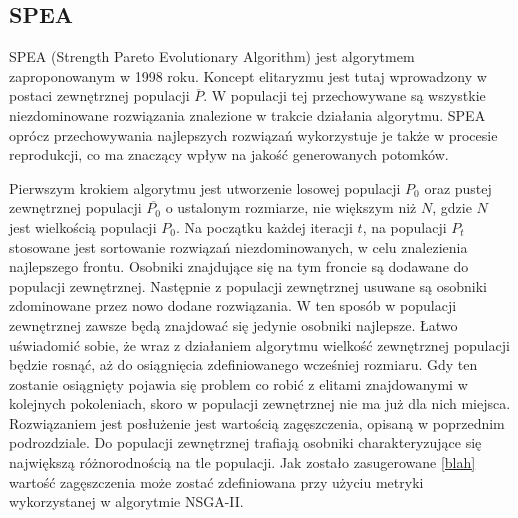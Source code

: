 \documentclass[twoside]{iisthesis}
\begin{document}
\subsection{SPEA}
SPEA (Strength Pareto Evolutionary Algorithm) jest algorytmem zaproponowanym w 1998 roku. Koncept elitaryzmu jest tutaj wprowadzony w postaci zewnętrznej populacji $\overline{P}$. W populacji tej przechowywane są wszystkie niezdominowane rozwiązania znalezione w trakcie działania algorytmu. SPEA oprócz przechowywania najlepszych rozwiązań wykorzystuje je także w procesie reprodukcji, co ma znaczący wpływ na jakość generowanych potomków.

Pierwszym krokiem algorytmu jest utworzenie losowej populacji $P_{0}$ oraz pustej zewnętrznej populacji $\overline{P_{0}}$ o ustalonym rozmiarze, nie większym niż $N$, gdzie $N$ jest wielkością populacji $P_{0}$. Na początku każdej iteracji $t$, na populacji $P_{t}$ stosowane jest sortowanie rozwiązań niezdominowanych, w celu znalezienia najlepszego frontu. Osobniki znajdujące się na tym froncie są dodawane do populacji zewnętrznej. Następnie z populacji zewnętrznej usuwane są osobniki zdominowane przez nowo dodane rozwiązania. W ten sposób w populacji zewnętrznej zawsze będą znajdować się jedynie osobniki najlepsze. Łatwo uświadomić sobie, że wraz z działaniem algorytmu wielkość zewnętrznej populacji będzie rosnąć, aż do osiągnięcia zdefiniowanego wcześniej rozmiaru. Gdy ten zostanie osiągnięty pojawia się problem co robić z elitami znajdowanymi w kolejnych pokoleniach, skoro w populacji zewnętrznej nie ma już dla nich miejsca. Rozwiązaniem jest posłużenie jest wartością zagęszczenia, opisaną w poprzednim podrozdziale. Do populacji zewnętrznej trafiają osobniki charakteryzujące się największą różnorodnością na tle populacji. Jak zostało zasugerowane \ref{blah} wartość zagęszczenia może zostać zdefiniowana przy użyciu metryki wykorzystanej w algorytmie NSGA-II.
\end{document}
